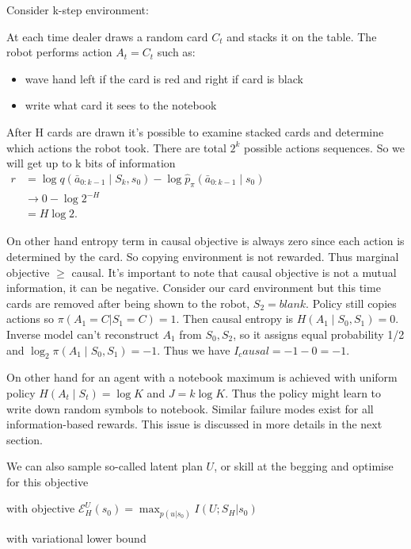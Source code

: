 Consider k-step environment:

At each time dealer draws a random card $C_t$ and stacks it on the table. The robot performs action $A_t = C_t$ such as:

\begin{itemize}
	\item wave hand left if the card is red and right if card is black
	\item write what card it sees to the notebook
\end{itemize}

After H cards are drawn it's possible to examine stacked cards and determine which actions the robot took. There are total $2^k$ possible actions sequences. So we will get up to k bits of information\\

$\begin{aligned}
	r
	&=
	\log q(\bar a_{0:k-1}\mid S_k, s_0)- \log \widehat p_\pi(\bar a_{0:k-1}\mid s_0)\\
	&\longrightarrow
	0-\log 2^{-H}\\
	&=H\log 2.
\end{aligned}$

On other hand entropy term in causal objective is always zero since each action is determined by the card. So copying environment is not rewarded. Thus marginal objective $\geq$ causal. It's important to note that causal objective is not a mutual information, it can be negative. Consider our card environment but this time cards are removed after being shown to the robot, $S_2=blank$. Policy still copies actions so $π(A_1=C| S_1=C) = 1$. Then causal entropy is $H(A_1∣S_0,S_1)=0$. Inverse model can't reconstruct $A_1$ from $S_0,S_2$, so it assigns equal probability 1/2 and $\log_2 π(A_1∣S_0,S_1) = -1$. Thus we have $I_causal = -1 - 0 = -1$.

On other hand for an agent with a notebook maximum is achieved with uniform policy $H(A_t∣S_t)=\log K$ and $J=k \log K$. Thus the policy might learn to write down random symbols to notebook. Similar failure modes exist for all information-based rewards. This issue is discussed in more details in the next section. 

We can also sample so-called latent plan $U$, or skill at the begging and optimise for this objective 

with objective
$\mathcal{E}^{U}_H(s_0) = \max_{p(u|s_0)} I(U;S_H|s_0)$

with variational lower bound

